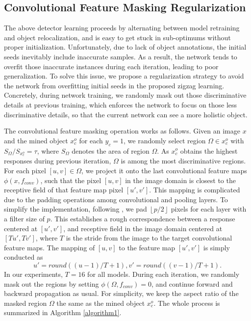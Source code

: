 \documentclass[10pt,twocolumn,letterpaper]{article}
\begin{document}
\subsection{Convolutional Feature Masking Regularization}
The above detector learning proceeds by alternating between model retraining and object relocalization, and is easy to get stuck in sub-optimums without proper initialization. Unfortunately, due to lack of object annotations, the initial seeds inevitably include inaccurate samples. As a result, the network tends to overfit those inaccurate instances during each iteration, leading to poor generalization. To solve this issue, we propose a regularization strategy to avoid the network from overfitting initial seeds in the proposed zigzag learning. Concretely, during network training, we randomly mask out those discriminative details at previous training, which enforces the network to focus on those less discriminative details, so that the current network can see a more holistic object.

The convolutional feature masking operation works as follows. Given an image $x$ and the mined object $x_c^o$ for each $y_c\!=\!1$, we randomly select region $\Omega \in x_c^o$ with $S_{\Omega}/S_{x_c^o}=\tau$, where $S_{\Omega}$ denotes the area of region $\Omega$. As $x_c^o$ obtains the highest responses during previous iteration, $\Omega$ is among the most discriminative regions. For each pixel $[u,v] \in \Omega$, we project it onto the last convolutional feature maps $\phi(x,f_{conv})$, such that the pixel $[u,v]$ in the image domain is closest to the receptive field of that feature map pixel $[u',v']$. This mapping is complicated due to the padding operations among convolutional and pooling layers. To simplify the implementation, following \cite{he2014spatial}, we pad $\left \lfloor p/2 \right \rfloor$ pixels for each layer with a filter size of $p$. This establishes a rough correspondence between a response centered at $[u', v']$, and receptive field in the image domain centered at $[Tu',Tv']$, where $T$ is the stride from the image to the target convolutional feature maps. The mapping of $[u, v]$ to the feature map $[u',v']$ is simply conducted as
\begin{equation}\label{mapping}
  u'=round((u\!-\!1)/T\!+\!1), v'=round((v\!-\!1)/T\!+\!1).
\end{equation}
In our experiments, $T=16$ for all models. During each iteration, we randomly mask out the regions by setting $\phi(\Omega, f_{conv})=0$, and continue forward and backward propagation as usual. For simplicity, we keep the aspect ratio of the masked region $\Omega$ the same as the mined object $x_c^o$. The whole process is summarized in Algorithm \ref{algorithm1}.
\end{document}
